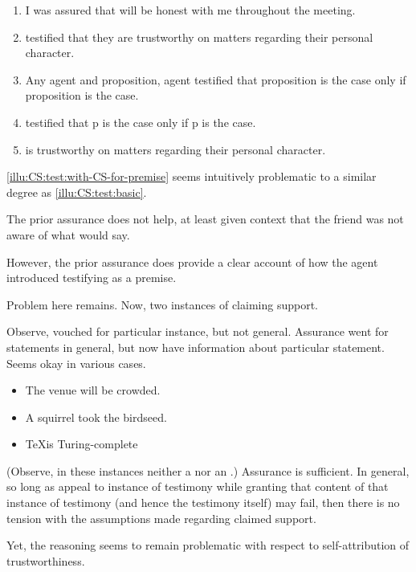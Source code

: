 \begin{note}[Testimony 2]
  \begin{illustration}[Testimony 2]
    \label{illu:CS:test:with-CS-for-premise}
    \mbox{}
    \begin{enumerate}[label=\arabic*., ref=(\arabic*)]
    \item I was assured that  will be honest with me throughout the meeting.
    \item\label{ex:eiS:tt:test}  testified that they are trustworthy on matters regarding their personal character.
    \item Any agent and proposition, agent testified that proposition is the case only if proposition is the case.
    \item {} testified that p is the case only if p is the case.
    \item\label{ex:eiS:tt:ok}  is trustworthy on matters regarding their personal character.
    \end{enumerate}
  \end{illustration}

  \autoref{illu:CS:test:with-CS-for-premise} seems intuitively problematic to a similar degree as \ref{illu:CS:test:basic}.

  The prior assurance does not help, at least given context that the friend was not aware of what  would say.

  However, the prior assurance does provide a clear account of how the agent introduced  testifying as a premise.
\end{note}

\begin{note}
  Problem here remains.
  Now, two instances of claiming support.

  Observe, vouched for particular instance, but not general.
  Assurance went for statements in general, but now have information about particular statement.
  Seems okay in various cases.

  \begin{itemize}
  \item The venue will be crowded.
  \item A squirrel took the birdseed.
  \item \TeX is Turing-complete
  \end{itemize}
  (Observe, in these instances neither a \requ{} nor an \expec{}.)
  Assurance is sufficient.
  In general, so long as appeal to instance of testimony while granting that content of that instance of testimony (and hence the testimony itself) may fail, then there is no tension with the assumptions made regarding claimed support.

  Yet, the reasoning seems to remain problematic with respect to self-attribution of trustworthiness.
\end{note}

